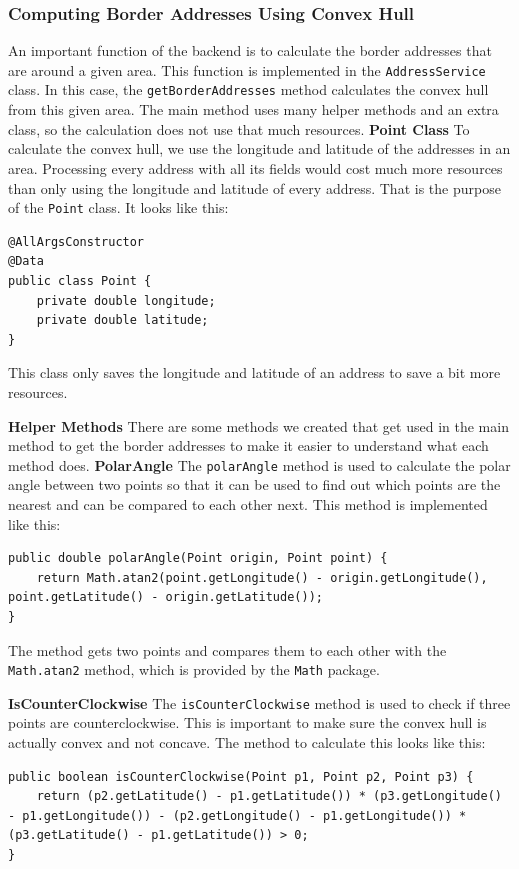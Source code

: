     \subsubsection{Computing Border Addresses Using Convex Hull}
    An important function of the backend is to calculate the border addresses that are around a given area. This function is implemented in the \texttt{AddressService} class. In this case, the \texttt{getBorderAddresses} method calculates the convex hull from this given area. The main method uses many helper methods and an extra class, so the calculation does not use that much resources. \newline
    \textbf{Point Class} \newline
    To calculate the convex hull, we use the longitude and latitude of the addresses in an area. Processing every address with all its fields would cost much more resources than only using the longitude and latitude of every address. That is the purpose of the \texttt{Point} class. It looks like this: 
    \lstset{style=mycsharp, caption=Point Class}
    \begin{lstlisting}
@AllArgsConstructor
@Data
public class Point {
    private double longitude;
    private double latitude;
}
    \end{lstlisting}
    This class only saves the longitude and latitude of an address to save a bit more resources. \newline

    \textbf{Helper Methods} \newline
    There are some methods we created that get used in the main method to get the border addresses to make it easier to understand what each method does. 
    \textbf{PolarAngle}
    The \texttt{polarAngle} method is used to calculate the polar angle between two points so that it can be used to find out which points are the nearest and can be compared to each other next. This method is implemented like this: 
    \lstset{style=mycsharp, caption=Polar Angle Method}
    \begin{lstlisting}
public double polarAngle(Point origin, Point point) {
    return Math.atan2(point.getLongitude() - origin.getLongitude(), point.getLatitude() - origin.getLatitude());
}
    \end{lstlisting}
    The method gets two points and compares them to each other with the \texttt{Math.atan2} method, which is provided by the \texttt{Math} package. \newline

    \textbf{IsCounterClockwise} \newline
    The \texttt{isCounterClockwise} method is used to check if three points are counterclockwise. This is important to make sure the convex hull is actually convex and not concave. The method to calculate this looks like this: 
    \lstset{style=mycsharp, caption=is Counter Clockwise Method}
    \begin{lstlisting}
public boolean isCounterClockwise(Point p1, Point p2, Point p3) {
    return (p2.getLatitude() - p1.getLatitude()) * (p3.getLongitude() - p1.getLongitude()) - (p2.getLongitude() - p1.getLongitude()) * (p3.getLatitude() - p1.getLatitude()) > 0;
}
    \end{lstlisting}

